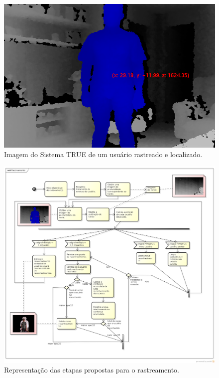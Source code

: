 	\begin{figure}[hbt]
		\begin{center}
			\includegraphics[scale=0.45]{figuras/4.ProblemaEProposta/localizacao.png}
		\end{center}
		\caption{Imagem do Sistema TRUE de um usuário rastreado e localizado.}
		\label{fig:localizacao}
	\end{figure}
	
	
	\begin{figure}[hbt]
		\begin{center}
			\includegraphics[scale=0.40]{figuras/4.ProblemaEProposta/diagrama-rastreamento.png}
		\end{center}
		\caption{Representação das etapas propostas para o rastreamento.}
		\label{fig:processo-rastreamento}
	\end{figure}
